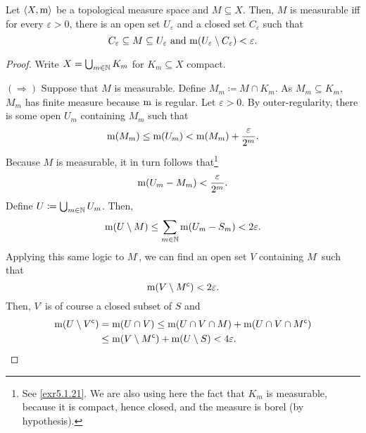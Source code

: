 \begin{prp}\label{prp5.1.39}
Let $\langle X,\mathrm{m}\rangle$ be a topological measure space and $M\subseteq X$.  Then, $M$ is measurable iff for every $\varepsilon >0$, there is an open set $U_{\varepsilon}$ and a closed set $C_{\varepsilon}$ such that
\begin{equation}
C_{\varepsilon}\subseteq M\subseteq U_{\varepsilon}\text{ and }\mathrm{m} (U_{\varepsilon}\setminus C_{\varepsilon})<\varepsilon .
\end{equation}
\begin{proof}
Write $X=\bigcup _{m\in \mathbb{N}}K_m$ for $K_m\subseteq X$ compact.

\blankline
\noindent
$(\Rightarrow )$  Suppose that $M$ is measurable.  Define $M_m\coloneqq M\cap K_m$.  As $M_m\subseteq K_m$, $M_m$ has finite measure because $\mathrm{m}$ is regular.  Let $\varepsilon >0$.  By outer-regularity, there is some open $U_m$ containing $M_m$ such that
\begin{equation}
\mathrm{m} (M_m)\leq \mathrm{m} (U_m)<\mathrm{m} (M_m)+\frac{\varepsilon}{2^m}.
\end{equation}
Because $M$ is measurable, it in turn follows that\footnote{See \cref{exr5.1.21}.  We are also using here the fact that $K_m$ is measurable, because it is compact, hence closed, and the measure is borel (by hypothesis).}
\begin{equation}
\mathrm{m} (U_m-M_m)<\frac{\varepsilon}{2^m}.
\end{equation}
Define $U\coloneqq \bigcup _{m\in \mathbb{N}}U_m$.  Then,
\begin{equation}
\mathrm{m} (U\setminus M)\leq \sum _{m\in \mathbb{N}}\mathrm{m} (U_m-S_m)<2\varepsilon .
\end{equation}
Applying this same logic to $M^{\comp}$, we can find an open set $V$ containing $M^{\comp}$ such that
\begin{equation}
\mathrm{m} (V\setminus M^{\mathsf{c} })<2\varepsilon .
\end{equation}
Then, $V^{\comp}$ is of course a closed subset of $S$ and
\begin{equation}
\begin{split}
\mathrm{m} (U\setminus V^{\mathsf{c}}) & =\mathrm{m} (U\cap V)\leq \mathrm{m} (U\cap V\cap M)+\mathrm{m} (U\cap V\cap M^{\mathsf{c}}) \\
& \leq \mathrm{m} (V\setminus M^{\mathsf{c}})+\mathrm{m} (U\setminus S)<4\varepsilon .
\end{split}
\end{equation}


\end{proof}
\end{prp}
